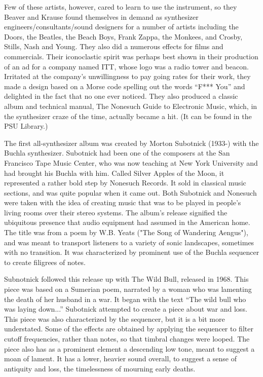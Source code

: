 Few of these artists, however, cared to learn to use the instrument, so they Beaver and Krause found themselves in demand as synthesizer engineers/consultants/sound designers for a number of artists including the Doors, the Beatles, the Beach Boys, Frank Zappa, the Monkees, and Crosby, Stills, Nash and Young. They also did a numerous effects for films and commercials. Their iconoclastic spirit was perhaps best shown in their production of an ad for a company named ITT, whose logo was a radio tower and beacon. Irritated at the company's unwillingness to pay going rates for their work, they made a design based on a Morse code spelling out the words ``F*** You'' and delighted in the fact that no one ever noticed. They also produced a classic album and technical manual, The Nonesuch Guide to Electronic Music, which, in the synthesizer craze of the time, actually became a hit. (It can be found in the PSU Library.)

The first all-synthesizer album was created by Morton Subotnick (1933-) with the Buchla synthesizer. Subotnick had been one of the composers at the San Francisco Tape Music Center, who was now teaching at New York University and had brought his Buchla with him. Called Silver Apples of the Moon, it represented a rather bold step by Nonesuch Records. It sold in classical music sections, and was quite popular when it came out. Both Subotnick and Nonesuch were taken with the idea of creating music that was to be played in people's living rooms over their stereo systems. The album's release signified the ubiquitous presence that audio equipment had assumed in the American home. The title was from a poem by W.B. Yeats ("The Song of Wandering Aengus"), and was meant to transport listeners to a variety of sonic landscapes, sometimes with no transition. It was characterized by prominent use of the Buchla sequencer to create filigrees of notes.

Subnotnick followed this release up with The Wild Bull, released in 1968. This piece was based on a Sumerian poem, narrated by a woman who was lamenting the death of her husband in a war. It began with the text ``The wild bull who was laying down...'' Subotnick attempted to create a piece about war and loss. This piece was also characterized by the sequencer, but it is a bit more understated. Some of the effects are obtained by applying the sequencer to filter cutoff frequencies, rather than notes, so that timbral changes were looped. The piece also has as a prominent element a descending low tone, meant to suggest a moan of lament. It has a lower, heavier sound overall, to suggest a sense of antiquity and loss, the timelessness of mourning early deaths.

